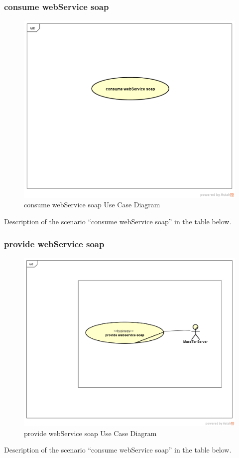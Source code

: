 \documentclass[12pt]{article}
\begin{document}
	 \subsubsection{consume webService soap}
	 	 	\begin{figure}[h]
	 	\centering
	 	\includegraphics[width=1.0\textwidth]{consumewebServicesoap.png}
	 	\caption{consume webService soap Use Case Diagram}
	 	
	 \end{figure}
 Description of the scenario ``consume webService soap'' in the table below.
 \clearpage
 \newpage

	 \subsubsection{provide webService soap} 
	 	\begin{figure}[h]
	 	\centering
	 	\includegraphics[width=1.0\textwidth]{provideWebServiceSoap.png}
	 	\caption{provide webService soap Use Case Diagram}
	 	
	 \end{figure}
  Description of the scenario ``consume webService soap'' in the table below.
 \clearpage
 \newpage
\end{document}
